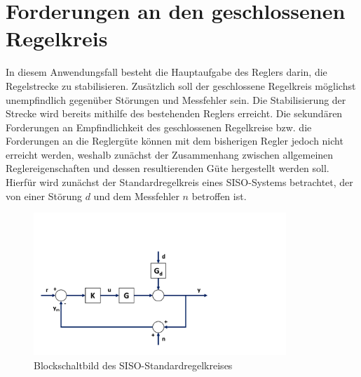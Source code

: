 \section{Forderungen an den geschlossenen Regelkreis}
In diesem Anwendungsfall besteht die Hauptaufgabe des Reglers darin, die Regelstrecke zu stabilisieren. Zusätzlich soll der geschlossene Regelkreis möglichst unempfindlich gegenüber Störungen und Messfehler sein. Die Stabilisierung der Strecke wird bereits mithilfe des bestehenden Reglers erreicht. Die sekundären Forderungen an Empfindlichkeit des geschlossenen Regelkreise bzw. die Forderungen an die Reglergüte können mit dem bisherigen Regler jedoch nicht erreicht werden, weshalb zunächst der Zusammenhang zwischen allgemeinen Reglereigenschaften und dessen resultierenden Güte hergestellt werden soll. Hierfür wird zunächst der Standardregelkreis eines SISO-Systems betrachtet, der von einer Störung $d$ und dem Messfehler $n$ betroffen ist.

\begin{figure}[h!]
\centering
\includegraphics[trim = 20px 50px 300px 150px, clip, width=0.85\textwidth]{img/StandardRegelkreis_BSB}
\caption{Blockschaltbild des SISO-Standardregelkreises}
\end{figure}

